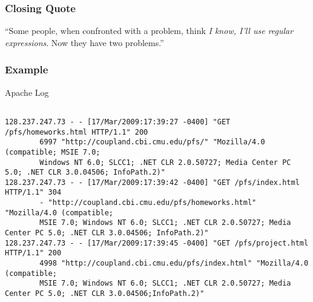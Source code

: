\begin{frame}[fragile]
\frametitle{Closing Quote}

``Some people, when confronted with a problem, think \textit{I know, I’ll use regular expressions}. Now they have two problems.''

\end{frame}

\begin{frame}[fragile]
\frametitle{Example}

\begin{block}{Apache Log}
\begin{verbatim}

128.237.247.73 - - [17/Mar/2009:17:39:27 -0400] "GET /pfs/homeworks.html HTTP/1.1" 200 
        6997 "http://coupland.cbi.cmu.edu/pfs/" "Mozilla/4.0 (compatible; MSIE 7.0; 
        Windows NT 6.0; SLCC1; .NET CLR 2.0.50727; Media Center PC 5.0; .NET CLR 3.0.04506; InfoPath.2)"
128.237.247.73 - - [17/Mar/2009:17:39:42 -0400] "GET /pfs/index.html HTTP/1.1" 304 
        - "http://coupland.cbi.cmu.edu/pfs/homeworks.html" "Mozilla/4.0 (compatible; 
        MSIE 7.0; Windows NT 6.0; SLCC1; .NET CLR 2.0.50727; Media Center PC 5.0; .NET CLR 3.0.04506; InfoPath.2)"
128.237.247.73 - - [17/Mar/2009:17:39:45 -0400] "GET /pfs/project.html HTTP/1.1" 200
        4998 "http://coupland.cbi.cmu.edu/pfs/index.html" "Mozilla/4.0 (compatible; 
        MSIE 7.0; Windows NT 6.0; SLCC1; .NET CLR 2.0.50727; Media Center PC 5.0; .NET CLR 3.0.04506;InfoPath.2)"
\end{verbatim}
\end{block}
\end{frame}


